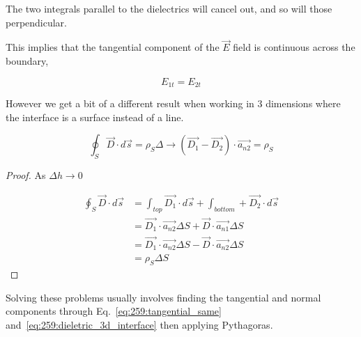 \documentclass[10pt]{article}
\begin{document}
\begin{intu}
	The two integrals parallel to the dielectrics will cancel out, and so will those perpendicular. 
\end{intu}

This implies that the tangential component of the $ \vec{E} $ field is continuous across the boundary,

\begin{equation}
	E_{1t} = E_{2t}
	\label{eq:259:tangential_same}
\end{equation}


However we get a bit of a different result when working in 3 dimensions where the interface is a surface instead of a line.

\begin{theorem}
	\begin{equation}
		\oint_S \vec{D} \cdot d\vec{s} = \rho_S \Delta \rightarrow (\vec{D_1} - \vec{D_2}) \cdot \vec{a_{n2}} = \rho_S
		\label{eq:259:dieletric_3d_interface}
	\end{equation}
\end{theorem}



\begin{proof}
	As $ \Delta h \to 0 $ 

	\begin{equation}
		\begin{split}
			\oint_S \vec{D} \cdot  d\vec{s} &=  \int_{top} \vec{D_1} \cdot d \vec{s} + \int_{bottom} + \vec{D_2} \cdot  d \vec{s} \\
																			& = \vec{D_1} \cdot  \vec{a_{n2}}  \Delta S + \vec{D} \cdot  \vec{a_{ n1 }} \Delta S \\
																			& = \vec{D_1} \cdot  \vec{a_{n2}}  \Delta S - \vec{D} \cdot  \vec{a_{ n2 }} \Delta S \\
																			& = \rho_S \Delta S
		\end{split} 
		\label{eq:259:derive_rhosDeltaS}
	\end{equation}
\end{proof}

Solving these problems usually involves finding the tangential and normal components through Eq.~\ref{eq:259:tangential_same} and~\ref{eq:259:dieletric_3d_interface} then applying Pythagoras.
\end{document}
